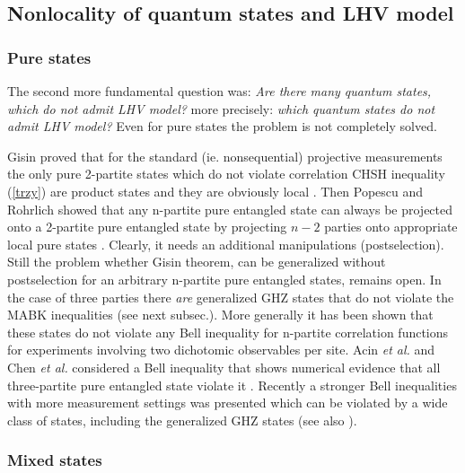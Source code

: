 \documentclass[twocolumn,aps,rmp]{revtex4}
\begin{document}
\subsection {Nonlocality of quantum states and LHV model}

\subsubsection{Pure states}
\label{subsec:pure}

The second more fundamental question was: {\it Are there many quantum
  states, which do not admit LHV model?} more precisely: {\it which quantum states do not admit LHV model?}
  Even for pure states the problem is not completely solved.

Gisin proved that for the standard (ie. nonsequential) projective
measurements the only pure 2-partite states which do not violate correlation CHSH inequality
(\ref{trzy}) are product states and they are obviously local \cite
{Gisin,GisinP1992}. Then Popescu and Rohrlich showed that any n-partite pure entangled state can always be projected onto a 2-partite pure entangled state by projecting $n-2$ parties onto appropriate local pure states \cite {Popescu}. Clearly, it needs
an additional manipulations (postselection). Still the problem whether Gisin theorem, can be generalized without postselection for an arbitrary n-partite pure entangled states, remains open. In the case of three parties there {\it are} generalized GHZ states \cite {ZukowskiW,Scarani} that do not violate the MABK inequalities \cite {M,Ardehali,Belinskii} (see next subsec.). More generally it has been shown \cite {ZukowskiW} that these states do not violate any Bell inequality for n-partite correlation functions for experiments involving two dichotomic observables per site. Acin {\it et al.} and Chen {\it et al.} considered a Bell inequality that shows numerical evidence that all three-partite pure entangled state violate it \cite {AcinCGKKOZ2004,ChenWKO2004}.
 Recently a stronger Bell inequalities with more measurement settings was presented \cite {LaskowskiPZB2004,WuZ2003} which can be violated by a wide class of states, including the generalized GHZ states (see also \cite{ChenAF2006}).

\subsubsection{Mixed states}
\label{subsec:Mixed}
\end{document}
